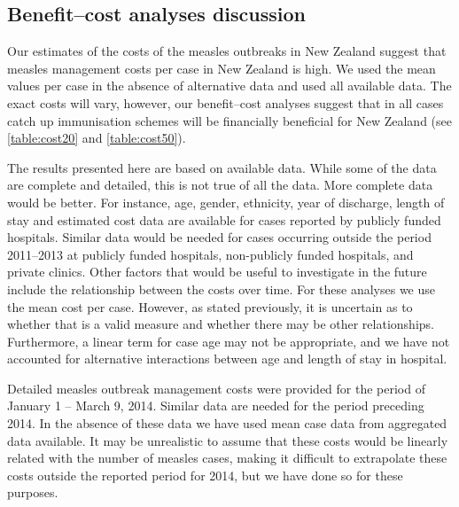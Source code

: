 \documentclass{article}
\begin{document}
\subsection{Benefit--cost analyses discussion}

Our estimates of the costs of the measles outbreaks in New Zealand suggest that measles management costs per case in New Zealand is high. We used the mean values per case in the absence of alternative data and used all available data. The exact costs will vary, however, our benefit--cost analyses suggest that in all cases catch up immunisation schemes will be financially beneficial for New Zealand (see \autoref{table:cost20} and \autoref{table:cost50}).

The results presented here are based on available data. While some of the data are complete and detailed, this is not true of all the data. More complete data would be better. For instance, age, gender, ethnicity, year of discharge, length of stay and estimated cost data are available for cases reported by publicly funded hospitals. Similar data would be needed for cases occurring outside the period 2011--2013 at publicly funded hospitals, non-publicly funded hospitals, and private clinics. Other factors that would be useful to investigate in the future include the relationship between the costs over time. For these analyses we use the mean cost per case. However, as stated previously, it is uncertain as to whether that is a valid measure and whether there may be other relationships. Furthermore, a linear term for case age may not be appropriate, and we have not accounted for alternative interactions between age and length of stay in hospital.

Detailed measles outbreak management costs were provided for the period of January 1 -- March 9, 2014. Similar data are needed for the period preceding 2014. In the absence of these data we have used mean case data from aggregated data available. It may be unrealistic to assume that these costs would be linearly related with the number of measles cases, making it difficult to extrapolate these costs outside the reported period for 2014, but we have done so for these purposes.
\end{document}
